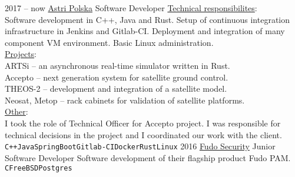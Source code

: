 \documentclass[10pt]{developercv} %
\begin{document}
\begin{entrylist}
	\entry
		{2017 -- now}
		{\href{https://astripolska.pl/}{Astri Polska}}
		{Software Developer}
        {\underline{Technical responsibilites}:\\
        Software development in C++, Java and Rust. Setup of continuous integration infrastructure in Jenkins and Gitlab-CI. Deployment and integration of many component VM environment. Basic Linux administration.\\
        \underline{Projects}:\\
        ARTSi -- an asynchronous real-time simulator written in Rust.\\
        Accepto -- next generation system for satellite ground control.\\
        THEOS-2 -- development and integration of a satellite model.\\
        Neosat, Metop -- rack cabinets for validation of satellite platforms.\\
        \underline{Other}:\\
        I took the role of Technical Officer for Accepto project. I was responsible for technical decisions in the project and I coordinated our work with the client.
        \\ \texttt{C++}\slashsep\texttt{Java}\slashsep\texttt{SpringBoot}\slashsep\texttt{Gitlab-CI}\slashsep\texttt{Docker}\slashsep\texttt{Rust}\slashsep\texttt{Linux}}
	\entry
		{2016}
		{\href{https://fudosecurity.com/}{Fudo Security}}
		{Junior Software Developer}
	    {Software development of their flagship product Fudo PAM.\\
		\texttt{C}\slashsep\texttt{FreeBSD}\slashsep\texttt{Postgres}}
\end{entrylist}


\begin{minipage}[t]{0.3\textwidth}
\vspace{-\baselineskip}
\begin{barchart}{2.5}
\end{barchart}
\end{minipage}
\begin{minipage}[t]{0.3\textwidth}
\vspace{-\baselineskip}
\begin{barchart}{2.5}
\end{barchart}
\end{minipage}
\begin{minipage}[t]{0.3\textwidth}
\vspace{-\baselineskip}
\begin{barchart}{2.5}
\end{barchart}
\end{minipage}
\end{document}
